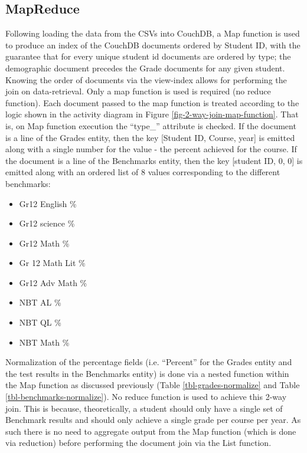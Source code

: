 \subsection{MapReduce}
Following loading the data from the CSVs into CouchDB, a Map function is used to produce an index of the CouchDB documents ordered by Student ID, with the guarantee that for every unique student id documents are ordered by type; the demographic document precedes the Grade documents for any given student. Knowing the order of documents via the view-index allows for performing the join on data-retrieval. Only a map function is used is required (no reduce function). Each document passed to the map function is treated according to the logic shown in the activity diagram in Figure \ref{fig-2-way-join-map-function}. That is, on Map function execution the ``type\_'' attribute is checked. If the document is a line of the Grades entity, then the key [Student ID, Course, year] is emitted along with a single number for the value - the percent achieved for the course. If the document is a line of the Benchmarks entity, then the key [student ID, 0, 0] is emitted along with an ordered list of 8 values corresponding to the different benchmarks:

\begin{itemize}
  \item Gr12 English \%
  \item Gr12 science \%
  \item Gr12 Math \%
  \item Gr 12 Math Lit \%
  \item Gr12 Adv Math \%
  \item NBT AL \%
  \item NBT QL \%
  \item NBT Math \%
\end{itemize}

Normalization of the percentage fields (i.e. ``Percent'' for the Grades entity and the test results in the Benchmarks entity) is done via a nested function within the Map function as discussed previously (Table \ref{tbl-grades-normalize} and Table \ref{tbl-benchmarks-normalize}). No reduce function is used to achieve this 2-way join. This is because, theoretically, a student should only have a single set of Benchmark results and should only achieve a single grade per course per year. As such there is no need to aggregate output from the Map function (which is done via reduction) before performing the document join via the List function.


